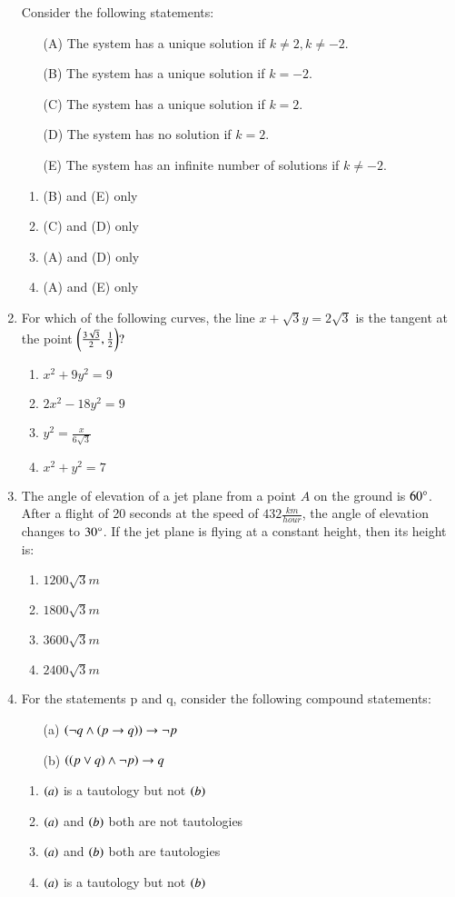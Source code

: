 \documentclass[journal,12pt,onecolumn]{IEEEtran}
\theoremstyle{remark}
\begin{document}
\begin{enumerate}
    Consider the following statements:
    \begin{enumerate}
    \item[(A)] The system has a unique solution if $k \neq 2, k \neq -2 $.
    \item[(B)] The system has a unique solution if $ k = -2 $.
    \item[(C)] The system has a unique solution if $k = 2 $.
    \item[(D)] The system has no solution if $ k = 2$.
    \item[(E)] The system has an infinite number of solutions if $ k \neq -2$.
    \end{enumerate}
    \begin{enumerate}
    \item (B) and (E) only
    \item (C) and (D) only
    \item (A) and (D) only
    \item (A) and (E) only
    \end{enumerate}
\item For which of the following curves, the line $x + \sqrt{3}y = 2\sqrt{3} $ is the tangent at the point $\left(\frac{3\sqrt{3}}{2}, \frac{1}{2}\right)?$
\begin{enumerate}
    \item $x^2+9y^2=9$
    \item $2x^2-18y^2=9$
    \item $y^2=\frac{x}{6\sqrt{3}}$
    \item $x^2+y^2=7$
\end{enumerate}
\item The angle of elevation of a jet plane from a point $A$ on the ground is $60\degree$. After a flight of 20 seconds at the speed of $432 \frac{km}{hour}$, the angle of elevation changes to $30\degree$. If the jet plane is flying at a constant height, then its height is:
\begin{enumerate}
    \item $1200\sqrt{3}m$
    \item $1800\sqrt{3}m$
    \item $3600\sqrt{3}m$
    \item $2400\sqrt{3}m$
\end{enumerate}
\item For the statements p and q, consider the following compound statements:
\begin{enumerate}
    \item[(a)] $\left(\neg q \land \left(p \rightarrow q\right)\right) \rightarrow \neg p $
    \item[(b)] $\left(\left(p \lor q\right) \land \neg p\right)\rightarrow q$
\end{enumerate}
\begin{enumerate}
    \item $\left(a\right)$ is a tautology but not $\left(b\right)$
    \item $\left(a\right)$ and $\left(b\right)$ both are not tautologies
    \item $\left(a\right)$ and $\left(b\right)$ both are tautologies
    \item $\left(a\right)$ is a tautology but not $\left(b\right)$
\end{enumerate}
    \end{enumerate}
\end{document}
